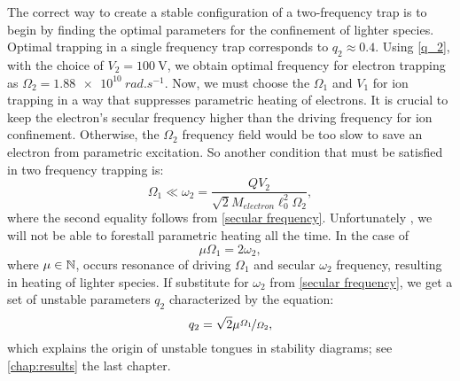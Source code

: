 The correct way to create a stable configuration of a two-frequency trap is to begin by finding the optimal parameters for the confinement of lighter species. Optimal trapping in a single frequency trap corresponds to \cite{gerlich1992inhomogeneous} $q_2 \approx 0.4$. Using \eqref{q_2}, with the choice of $V_2 = \SI{100}{\volt}$, we obtain optimal frequency for electron trapping as $\Omega_2 = \SI{1.88e10}{rad.s^{-1}}$. Now, we must choose the $\Omega_1$ and $V_1$ for ion trapping in a way that suppresses parametric heating of electrons. It is crucial to keep the electron's secular frequency higher than the driving frequency for ion confinement. Otherwise, the $\Omega_2$ frequency field would be too slow to save an electron from parametric excitation. So another condition that must be satisfied in two frequency trapping is:
\begin{equation}
	\Omega_1 \ll \omega_2 = \dfrac{Q V_2}{\sqrt{2} M_{electron} \ell_0^2 \Omega_2},
\end{equation}
where the second equality follows from \eqref{secular frequency}. Unfortunately \cite{FOOT2018117}, we will not be able to forestall parametric heating all the time. In the case of $$\mu \Omega_1 = 2 \omega_2,$$
where $\mu \in \mathbb{N}$, occurs resonance of driving $\Omega_1$ and secular $\omega_2$ frequency, resulting in heating of lighter species. If substitute for $\omega_2$ from \eqref{secular frequency}, we get a set of unstable parameters $q_2$ characterized by the equation:
\begin{equation}
	\label{unstable q_2}
	q_2 = \sqrt{2}\mu\nicefrac{\Omega_1}{\Omega_2},
\end{equation}
which explains the origin of unstable tongues in stability diagrams; see \ref{chap:results} the last chapter.


\begin{comment}%
\xxx{\dots build a little bridge from the section explaining a single frequency trap. We need two frequencies for particles with widely different charge to mass ratios: $Q_m \equiv \nicefrac{Q}{m}$ \cite{FOOT2018117}.}
\end{comment}%

